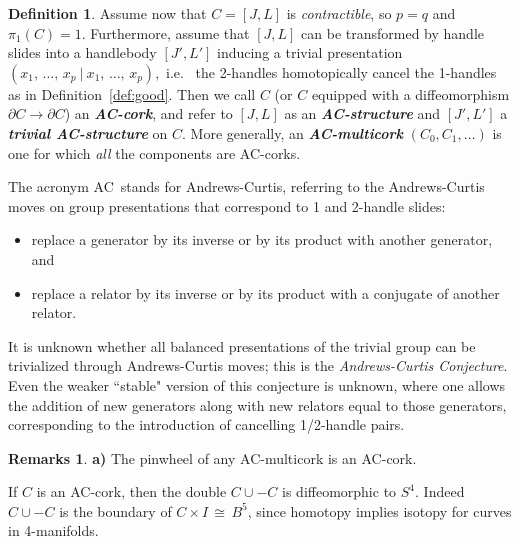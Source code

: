 \documentclass[11pt]{amsart}
\theoremstyle{definition}
\newtheorem{definition}[theorem]{Definition}
\newtheorem{remarks}[theorem]{Remarks}
\newcommand{\defref}[1]{Definition~\ref{#1}}
\newcommand{\head}[1]{\bigskip\noindent{\bf #1}}
\newcommand{\bit}[1]{\textbf{\textit{#1}}} %
\newcommand{\del}{\partial}
\newcommand{\ac}{\textup{AC}}
\newcommand{\items}{\begin{itemize}[leftmargin=25pt,rightmargin=5pt]
  \setlength\itemsep{2pt}}
\newcommand{\stopitems}{\end{itemize}}
\begin{document}
\begin{definition}  
Assume now that $C=[J,L]$ is {\sl contractible}, so $p=q$ and $\pi_1(C)=1$. Furthermore, assume that $[J,L]$ can be transformed by handle slides into a handlebody $[J',L']$ inducing a trivial presentation
$
(x_1,\, \dots , \, x_p \ | \ x_1,\,\dots,\, x_p),
$
i.e.\ 
the 2-handles homotopically cancel the 1-handles as in \defref{def:good}.  Then we call $C$ (or $C$ equipped with a diffeomorphism $\del C\to\del C$) an \bit{\ac-cork}, and refer to $[J,L]$ as an \bit{\ac-structure} and $[J',L']$ a \bit{trivial \ac-structure} on $C$.  More generally, an \bit{\ac-multicork} $(C_0,C_1,\dots)$ is one for which {\sl all} the components are \ac-corks.
\end{definition}


The acronym \ac\ stands for Andrews-Curtis, referring to the Andrews-Curtis moves \cite{ac} on group presentations that correspond to 1 and 2-handle slides: \items
\item[a)] replace a generator by its inverse or by its product with another generator, and
\item[b)] replace a relator by its inverse or by its product with a conjugate of another relator.
\stopitems
It is unknown whether all balanced presentations of the trivial group can be trivialized through Andrews-Curtis moves; this is the {\it Andrews-Curtis Conjecture}.   Even the weaker ``stable" version of this conjecture is unknown, where one allows the addition of new generators along with new relators equal to those generators, corresponding to the introduction of cancelling 1/2-handle pairs. 

\begin{remarks}\label{double}  {\bf a)} The pinwheel of any \ac-multicork is an \ac-cork.

 If $C$ is an \ac-cork, then the double $C\cup -C$ is diffeomorphic to $S^4$.  Indeed $C\cup -C$ is the boundary of $C\times I \, \cong \, B^5$, since homotopy implies isotopy for curves in 4-manifolds. 
\end{remarks}


\head{Zero-Dot Swaps and Classic Corks}
\end{document}
